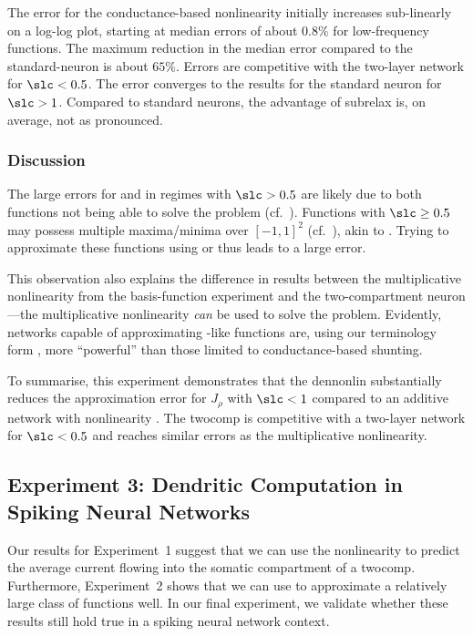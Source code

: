 The error for the conductance-based \twocomplif nonlinearity initially increases sub-linearly on a log-log plot, starting at median errors of about $0.8\%$ for low-frequency functions.
The maximum reduction in the median error compared to the standard-\LIF neuron is about $65\%$.
Errors are competitive with the two-layer network for $\slc < 0.5$.
The error converges to the results for the standard \LIF neuron for $\slc > 1$.
Compared to standard \LIF neurons, the advantage of \gls{subrelax} is, on average, not as pronounced.

\subsubsection{Discussion}
The large errors for \Hcur and \Hcond in regimes with $\slc > 0.5$ are likely due to both functions not being able to solve the \XOR problem (cf.~).
Functions with $\slc \geq 0.5$ may possess multiple maxima/minima over $[-1, 1]^2$ (cf.~), akin to \XOR.
Trying to approximate these functions using \Hcur or \Hcond thus leads to a large error.

This observation also explains the difference in results between the multiplicative nonlinearity from the basis-function experiment and the two-compartment \LIF neuron---the multiplicative nonlinearity \emph{can} be used to solve the \XOR problem.
Evidently, networks capable of approximating \XOR-like functions are, using our terminology form , more \enquote{powerful} than those limited to conductance-based shunting.

To summarise, this experiment demonstrates that the \twocomplif \gls{dennonlin} \Hcond substantially reduces the approximation error for $J_\rho$ with $\slc < 1$ compared to an additive network with nonlinearity \Hcur.
The \gls{twocomp} is competitive with a two-layer network for $\slc < 0.5$ and reaches similar errors as the multiplicative nonlinearity.


\subsection{Experiment 3: Dendritic Computation in Spiking Neural Networks}
\label{sec:two_comp_lif_experiment_3}

Our results for Experiment~1 suggest that we can use the \twocomplif nonlinearity \Hcond to predict the average current flowing into the somatic compartment of a \gls{twocomp}.
Furthermore, Experiment~2 shows that we can use \Hcond to approximate a relatively large class of functions well.
In our final experiment, we validate whether these results still hold true in a spiking neural network context.

